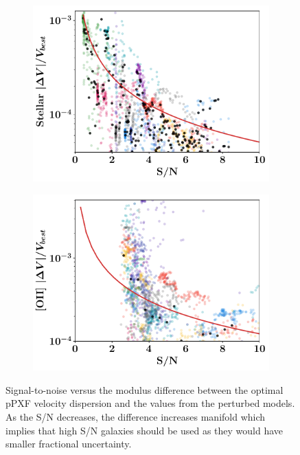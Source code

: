 \documentclass[12pt, twocolumn]{revtex4}    %
\begin{document}
\begin{figure}
\begin{subfigure}[b]{0.495\textwidth}
    \includegraphics[width=\textwidth]{data/ppxf_vel_frac_error_vs_sn}
    \label{fig:mean and std of net34}
\end{subfigure}
\begin{subfigure}[b]{0.495\textwidth}   
    \centering 
    \includegraphics[width=\textwidth]{data/lmfit_vel_frac_error_vs_sn}
    \label{fig:mean and std of net44}
\end{subfigure}
\captionsetup{justification=raggedright}
\caption[HUDF Objects]{Signal-to-noise versus the modulus difference between the optimal pPXF velocity dispersion and the values from the perturbed models. As the S/N decreases, the difference increases manifold which implies that high S/N galaxies should be used as they would have smaller fractional uncertainty.}
  \label{fig:fractional_errors}
\end{figure}
\end{document}
